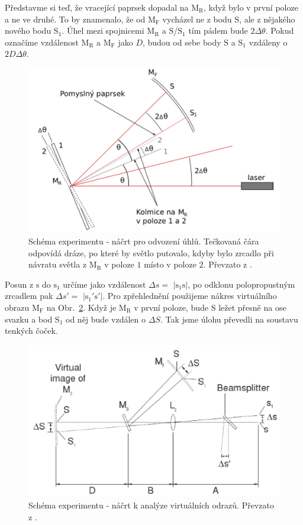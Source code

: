 \documentclass[english]{article}
\newcommand{\bb}[1]{\boldmath{}\textbf{$\mathrm{#1}$}\unboldmath{}}
\begin{document}
			Představme si teď, že vracející paprsek dopadal na \bb{M_R}, když bylo v první poloze a ne ve druhé. To by znamenalo, že od \bb{M_F} vycházel ne z bodu \bb{S}, ale z nějakého nového bodu \bb{S_1}. Úhel mezi spojnicemi \bb{M_R} a \bb{S}/\bb{S_1} tím pádem bude $2\Delta\theta$. Pokud označíme vzdálenost \bb{M_R} a \bb{M_F} jako $D$, budou od sebe body \bb{S} a \bb{S_1} vzdáleny o $2D\Delta\theta$. 
			
				\begin{figure}[h!]
				\begin{center}
					\includegraphics[width=0.7\linewidth]{att/draha_svetla.jpg}
					\caption{Schéma experimentu - náčrt pro odvození úhlů. Tečkovaná čára odpovídá dráze, po které by světlo putovalo, kdyby bylo zrcadlo při návratu světla z \bb{M_R} v poloze \bb{1} místo v poloze \bb{2}. Převzato z \cite{bib:zadani}.}
					\label{fig:s_draha}
				\end{center}
				\end{figure}			 
			
			Posun z \bb{s} do \bb{s_1} určíme jako vzdálenost $\Delta s = $ \bb{|s_1s|}, po odklonu polopropustným zrcadlem pak $\Delta s' = $ \bb{|s_1's'|}. Pro zpřehlednění použijeme nákres virtuálního obrazu \bb{M_F} na Obr.~\ref{fig:s_virtu}. Když je \bb{M_R} v první poloze, bude \bb{S} ležet přesně na ose svazku a bod \bb{S_1} od něj bude vzdálen o $\Delta S$. Tak jsme úlohu převedli na soustavu tenkých čoček.  
		
				\begin{figure}[h!]
				\begin{center}
					\includegraphics[width=0.7\linewidth]{att/virtu.jpg}
					\caption{Schéma experimentu - náčrt k analýze virtuálních odrazů. Převzato z \cite{bib:zadani}.}
					\label{fig:s_virtu}
				\end{center}
				\end{figure}			
				
\end{document}
